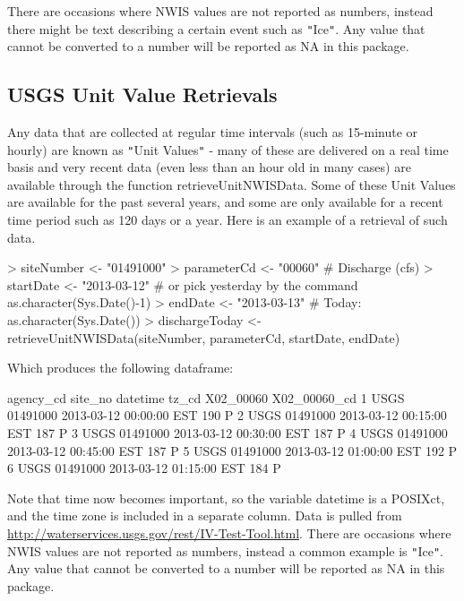 \documentclass[a4paper,11pt]{article}
\begin{document}
There are occasions where NWIS values are not reported as numbers, instead there might be text describing a certain event such as \texttt{"}Ice\texttt{"}.  Any value that cannot be converted to a number will be reported as NA in this package.


\subsection{USGS Unit Value Retrievals}
\label{sec:usgsRT}
Any data that are collected at regular time intervals (such as 15-minute or hourly) are known as \texttt{"}Unit Values\texttt{"} - many of these are delivered on a real time basis and very recent data (even less than an hour old in many cases) are available through the function retrieveUnitNWISData.  Some of these Unit Values are available for the past several years, and some are only available for a recent time period such as 120 days or a year.  Here is an example of a retrieval of such data.  

\begin{Schunk}
\begin{Sinput}
> siteNumber <- "01491000"
> parameterCd <- "00060"  # Discharge (cfs)
> startDate <- "2013-03-12" # or pick yesterday by the command as.character(Sys.Date()-1)
> endDate <- "2013-03-13" # Today: as.character(Sys.Date())
> dischargeToday <- retrieveUnitNWISData(siteNumber, parameterCd, 
         startDate, endDate)
\end{Sinput}
\end{Schunk}
Which produces the following dataframe:
\begin{Schunk}
\begin{Soutput}
  agency_cd  site_no            datetime tz_cd X02_00060 X02_00060_cd
1      USGS 01491000 2013-03-12 00:00:00   EST       190            P
2      USGS 01491000 2013-03-12 00:15:00   EST       187            P
3      USGS 01491000 2013-03-12 00:30:00   EST       187            P
4      USGS 01491000 2013-03-12 00:45:00   EST       187            P
5      USGS 01491000 2013-03-12 01:00:00   EST       192            P
6      USGS 01491000 2013-03-12 01:15:00   EST       184            P
\end{Soutput}
\end{Schunk}

Note that time now becomes important, so the variable datetime is a POSIXct, and the time zone is included in a separate column. Data is pulled from \url{http://waterservices.usgs.gov/rest/IV-Test-Tool.html}. There are occasions where NWIS values are not reported as numbers, instead a common example is \texttt{"}Ice\texttt{"}.  Any value that cannot be converted to a number will be reported as NA in this package.
\end{document}
